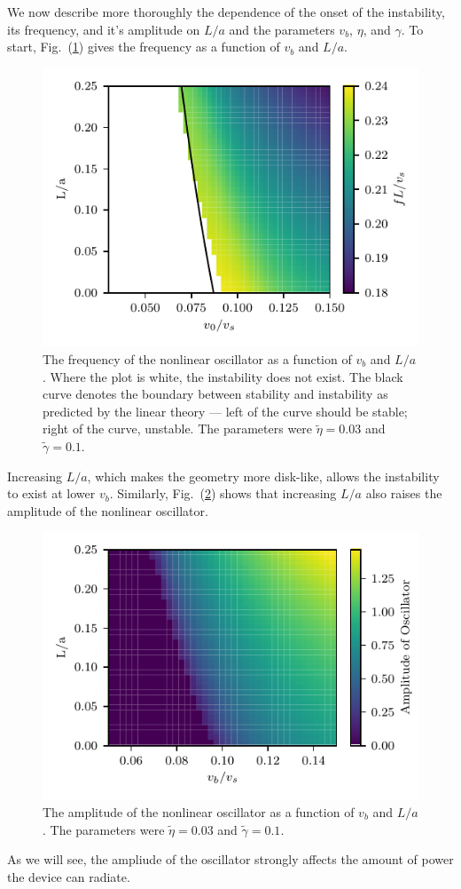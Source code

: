 \documentclass[12pt]{article}
\begin{document}
We now describe more thoroughly the dependence of the onset of the instability, its frequency, and it's amplitude on $L/a$ and the parameters $v_b$, $\eta$, and $\gamma$.  To start, Fig.~(\ref{fig:v0_ratio}) gives the frequency as a function of $v_b$ and $L/a$.  
\begin{figure}[ht]
	\centering
	\includegraphics{Figures/v0_ratio1.pdf}
	\caption{The frequency of the nonlinear oscillator as a function of $v_b$ and $L/a$.  Where the plot is white, the instability does not exist. The black curve denotes the boundary between stability and instability as predicted by the linear theory --- left of the curve should be stable; right of the curve, unstable.  The parameters were $\tilde{\eta}=0.03$ and $\tilde{\gamma}=0.1.$}
	\label{fig:v0_ratio}
\end{figure}
Increasing $L/a$, which makes the geometry more disk-like, allows the instability to exist at lower $v_b$. Similarly, Fig.~(\ref{fig:v0_ratio_power}) shows that increasing $L/a$ also raises the amplitude of the nonlinear oscillator.
\begin{figure}[ht]
	\centering
	\includegraphics{Figures/v0_ratio_power1.pdf}
	\caption{The amplitude of the nonlinear oscillator as a function of $v_b$ and $L/a$.  The parameters were $\tilde{\eta}=0.03$ and $\tilde{\gamma}=0.1.$}
	\label{fig:v0_ratio_power}
\end{figure}
As we will see, the ampliude of the oscillator strongly affects the amount of power the device can radiate.
\end{document}
